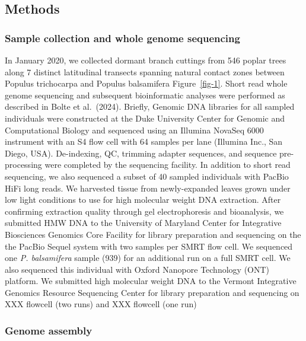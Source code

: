 \documentclass[
]{agujournal2019}
\begin{document}
\subsection{Methods}\label{methods}

\subsubsection{Sample collection and whole genome
sequencing}\label{sample-collection-and-whole-genome-sequencing}

In January 2020, we collected dormant branch cuttings from 546 poplar
trees along 7 distinct latitudinal transects spanning natural contact
zones between Populus trichocarpa and Populus balsamifera
Figure~\ref{fig-1}. Short read whole genome sequencing and subsequent
bioinformatic analyses were performed as described in Bolte et
al.~(2024). Briefly, Genomic DNA libraries for all sampled individuals
were constructed at the Duke University Center for Genomic and
Computational Biology and sequenced using an Illumina NovaSeq 6000
instrument with an S4 flow cell with 64 samples per lane (Illumina Inc.,
San Diego, USA). De-indexing, QC, trimming adapter sequences, and
sequence pre-processing were completed by the sequencing facility. In
addition to short read sequencing, we also sequenced a subset of 40
sampled individuals with PacBio HiFi long reads. We harvested tissue
from newly-expanded leaves grown under low light conditions to use for
high molecular weight DNA extraction. After confirming extraction
quality through gel electrophoresis and bioanalysis, we submitted HMW
DNA to the University of Maryland Center for Integrative Biosciences
Genomics Core Facility for library preparation and sequencing on the the
PacBio Sequel system with two samples per SMRT flow cell. We sequenced
one \emph{P. balsamifera} sample (939) for an additional run on a full
SMRT cell. We also sequenced this individual with Oxford Nanopore
Technology (ONT) platform. We submitted high molecular weight DNA to the
Vermont Integrative Genomics Resource Sequencing Center for library
preparation and sequencing on XXX flowcell (two runs) and XXX flowcell
(one run)

\subsubsection{Genome assembly}\label{genome-assembly}
\end{document}
